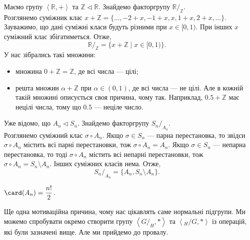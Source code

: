 \documentclass{math_library}
\begin{document}
\begin{example}
Маємо групу $\left< \mathbb{R}, + \right>$ та $\mathbb{Z} \triangleleft \mathbb{R}$. Знайдемо факторгрупу $\mathbb{R}/_{\mathbb{Z}}$.\\
Розглянемо суміжник клас $x + \mathbb{Z} = \{ \dots, -2+x, -1+x, x, 1+x, 2+x, \dots\}$. Зауважимо, що дані суміжні класи будуть різними при $x \in [0,1)$. При інших $x$ суміжний клас збігатиметься. Отже,
\[ 
\mathbb{R}/_{\mathbb{Z}} = \{ x + \mathbb{Z} \mid x \in [0,1) \}.
\]
У нас зібрались такі множини:
\begin{itemize}[nosep,wide=0pt]
\item множина $0 + \mathbb{Z} = \mathbb{Z}$, де всі числа --- цілі;
\item решта множин $\alpha + \mathbb{Z}$ при $\alpha \in (0,1)$, де всі числа --- не цілі. Але в кожній такій множині описується своя причина, чому так. Наприклад, $0.5 + \mathbb{Z}$ має нецілі числа, тому що $0.5$ --- неціле число.
\end{itemize}
\end{example}

\begin{example}
Уже відомо, що $A_n \triangleleft S_n$. Знайдемо факторгрупу $S_n/_{A_n}$.\\
Розглянемо суміжний клас $\sigma \circ A_n$. Якщо $\sigma \in S_n$ --- парна перестановка, то звідси $\sigma \circ A_n$ містить всі парні перестановки, тож $\sigma \circ A_n = A_n$. Якщо $\sigma \in S_n$ --- непарна перестановка, то тоді $\sigma \circ A_n$ містить всі непарні перестановки, тож $\sigma \circ A_n = S_n \setminus A_n$. Інших суміжних класів нема. Отже, 
\[
S_n/_{A_n} = \{A_n, S_n \setminus A_n\}.
\]
\end{example}

\begin{corollary}
$\card (A_n) = \dfrac{n!}{2}$.
\end{corollary}

Ще одна мотиваційна причина, чому нас цікавлять саме нормальні підгрупи. Ми можемо спробувати окремо створити групу $\left< G/_H, * \right>$ та $\left< {}_H/G, * \right>$ із операцій, які були зазначені вище. Але ми прийдемо до провалу.
\end{document}
